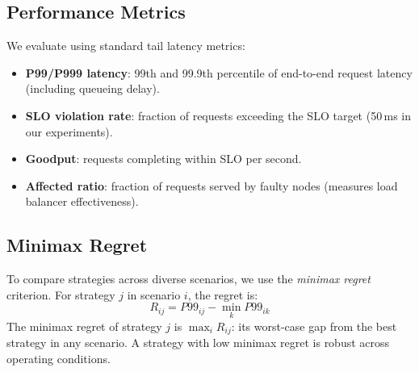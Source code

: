 \subsection{Performance Metrics}

We evaluate using standard tail latency metrics:
\begin{itemize}
\item \textbf{P99/P999 latency}: 99th and 99.9th percentile of
  end-to-end request latency (including queueing delay).
\item \textbf{SLO violation rate}: fraction of requests exceeding the
  SLO target (50\,ms in our experiments).
\item \textbf{Goodput}: requests completing within SLO per second.
\item \textbf{Affected ratio}: fraction of requests served by faulty
  nodes (measures load balancer effectiveness).
\end{itemize}

\subsection{Minimax Regret}

To compare strategies across diverse scenarios, we use the \emph{minimax
regret} criterion. For strategy $j$ in scenario $i$, the regret is:
\begin{equation}
  R_{ij} = P99_{ij} - \min_k P99_{ik}
\end{equation}
The minimax regret of strategy $j$ is $\max_i R_{ij}$: its worst-case
gap from the best strategy in any scenario. A strategy with low minimax
regret is robust across operating conditions.
